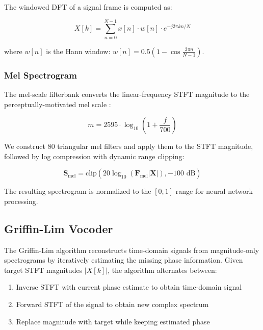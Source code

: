 \documentclass[conference]{IEEEtran}
\begin{document}
The windowed DFT of a signal frame is computed as:

\begin{equation}
X[k] = \sum_{n=0}^{N-1} x[n] \cdot w[n] \cdot e^{-j2\pi kn/N}
\end{equation}

where $w[n]$ is the Hann window: $w[n] = 0.5\left(1 - \cos\frac{2\pi n}{N-1}\right)$.

\subsubsection{Mel Spectrogram}

The mel-scale filterbank converts the linear-frequency STFT magnitude to the perceptually-motivated mel scale \cite{stevens1937mel}:

\begin{equation}
m = 2595 \cdot \log_{10}\left(1 + \frac{f}{700}\right)
\end{equation}

We construct 80 triangular mel filters and apply them to the STFT magnitude, followed by log compression with dynamic range clipping:

\begin{equation}
\mathbf{S}_{\text{mel}} = \text{clip}\left(20 \log_{10}(\mathbf{F}_{\text{mel}} |\mathbf{X}|), -100 \text{ dB}\right)
\end{equation}

The resulting spectrogram is normalized to the $[0, 1]$ range for neural network processing.

\subsection{Griffin-Lim Vocoder}

The Griffin-Lim algorithm \cite{griffin1984signal} reconstructs time-domain signals from magnitude-only spectrograms by iteratively estimating the missing phase information. Given target STFT magnitudes $|X[k]|$, the algorithm alternates between:

\begin{enumerate}
\item Inverse STFT with current phase estimate to obtain time-domain signal
\item Forward STFT of the signal to obtain new complex spectrum
\item Replace magnitude with target while keeping estimated phase
\end{enumerate}
\end{document}
